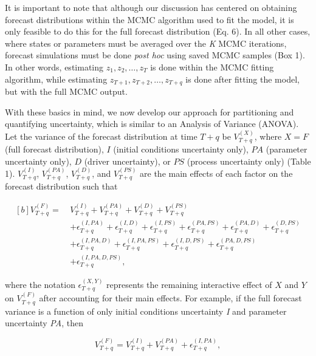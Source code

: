 \documentclass[12pt,]{article}
\begin{document}
It is important to note that although our discussion has centered on
obtaining forecast distributions within the MCMC algorithm used to fit
the model, it is only feasible to do this for the full forecast
distribution (Eq. 6). In all other cases, where states or parameters
must be averaged over the \emph{K} MCMC iterations, forecast simulations
must be done \emph{post hoc} using saved MCMC samples (Box 1). In other
words, estimating \(z_1,z_2,\dots,z_T\) is done within the MCMC fitting
algorithm, while estimating \(z_{T+1},z_{T+2},\dots,z_{T+q}\) is done
after fitting the model, but with the full MCMC output.

With these basics in mind, we now develop our approach for partitioning
and quantifying uncertainty, which is similar to an Analysis of Variance
(ANOVA). Let the variance of the forecast distribution at time \(T+q\)
be \(V^{(X)}_{T+q}\), where \(X=F\) (full forecast distribution), \(I\)
(initial conditions uncertainty only), \(PA\) (parameter uncertainty
only), \(D\) (driver uncertainty), or \(PS\) (process uncertainty only)
(Table 1). \(V_{T+q}^{(I)}\), \(V_{T+q}^{(PA)}\), \(V_{T+q}^{(D)}\), and
\(V_{T+q}^{(PS)}\) are the main effects of each factor on the forecast
distribution such that

\begin{equation}
\begin{aligned}[b]
V_{T+q}^{(F)} = \ &V_{T+q}^{(I)} + V_{T+q}^{(PA)} + V_{T+q}^{(D)} + V_{T+q}^{(PS)} \\
&+ \epsilon_{T+q}^{(I,PA)} + \epsilon_{T+q}^{(I,D)} + \epsilon_{T+q}^{(I,PS)} + \epsilon_{T+q}^{(PA,PS)} + \epsilon_{T+q}^{(PA,D)} + \epsilon_{T+q}^{(D,PS)} \\
&+ \epsilon_{T+q}^{(I,PA,D)} + \epsilon_{T+q}^{(I,PA,PS)} + \epsilon_{T+q}^{(I,D,PS)} + \epsilon_{T+q}^{(PA,D,PS)} \\
&+ \epsilon_{T+q}^{(I,PA,D,PS)},
\end{aligned}
\end{equation}

\noindent{}where the notation \(\epsilon_{T+q}^{(X,Y)}\) represents the
remaining interactive effect of \(X\) and \(Y\) on \(V_{T+q}^{(F)}\)
after accounting for their main effects. For example, if the full
forecast variance is a function of only initial conditions uncertainty
\emph{I} and parameter uncertainty \emph{PA}, then

\begin{equation}
V^{(F)}_{T+q} = V^{(I)}_{T+q} + V^{(PA)}_{T+q} + \epsilon_{T+q}^{(I,PA)},
\end{equation}
\end{document}
